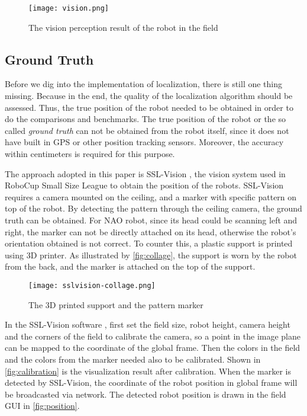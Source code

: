 \begin{figure}[h!]
  \centering
  \texttt{[image: vision.png]}
  \caption{The vision perception result of the robot in the field}
  \label{fig:perception}
\end{figure}

\subsection{Ground Truth}\label{sub:ground truth}
Before we dig into the implementation of localization, there is still one thing missing. Because in the end, the quality of the localization algorithm should be assessed. Thus, the true position of the robot needed to be obtained in order to do the comparisons and benchmarks. The true position of the robot or the so called \textit{ground truth} can not be obtained from the robot itself, since it does not have built in \gls{GPS} or other position tracking sensors. Moreover, the accuracy within centimeters is required for this purpose. 

The approach adopted in this paper is SSL-Vision \cite{zickler2010ssl}, the vision system used in RoboCup Small Size League to obtain the position of the robots. SSL-Vision requires a camera mounted on the ceiling, and a marker with specific pattern on top of the robot. By detecting the pattern through the ceiling camera, the ground truth can be obtained. For NAO robot, since its head could be scanning left and right, the marker can not be directly attached on its head, otherwise the robot's orientation obtained is not correct. To counter this, a plastic support is printed using 3D printer. As illustrated by \autoref{fig:collage}, the support is worn by the robot from the back, and the marker is attached on the top of the support.

\begin{figure}[h!]
  \centering
  \texttt{[image: sslvision-collage.png]}
  \caption{The 3D printed support and the pattern marker}
  \label{fig:collage}
\end{figure}

In the SSL-Vision software \cite{sslvision_yuan}, first set the field size, robot height, camera height and the corners of the field to calibrate the camera, so a point in the image plane can be mapped to the coordinate of the global frame. Then the colors in the field and the colors from the marker needed also to be calibrated. Shown in \autoref{fig:calibration} is the visualization result after calibration. When the marker is detected by SSL-Vision, the coordinate of the robot position in global frame will be broadcasted via network. The detected robot position is drawn in the field GUI in \autoref{fig:position}.\\

